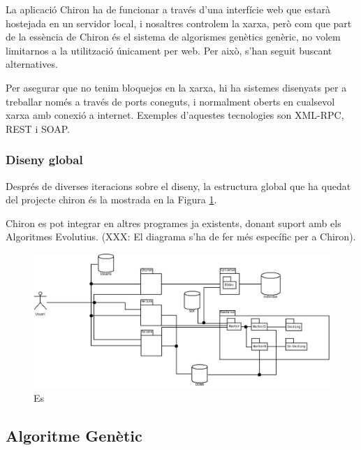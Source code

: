 \documentclass[titlepage,a4paper,12pt]{book}
\begin{document}
La aplicació Chiron ha de funcionar a través d'una interfície web que estarà
hostejada en un servidor local, i nosaltres controlem la xarxa, però com que
part de la essència de Chiron és el sistema de algorismes genètics genèric, no
volem limitarnos a la utilització únicament per web.  Per això, s'han seguit
buscant alternatives.

Per asegurar que no tenim bloquejos en la xarxa, hi ha sistemes disenyats per a
treballar només a través de ports coneguts, i normalment oberts en cualsevol
xarxa amb conexió a internet.  Exemples d'aquestes tecnologies son XML-RPC, REST
i SOAP.

\subsubsection{Diseny global} %
\label{ssub:Diseny global}

Després de diverses iteracions sobre el diseny, la estructura global que ha
quedat del projecte chiron és la mostrada en la Figura \ref{fig:disenyChiron}.

Chiron es pot integrar en altres programes ja existents, donant suport amb els
Algoritmes Evolutius.  (XXX: El diagrama s'ha de fer més específic per a
Chiron).

\begin{figure}[h]
	\begin{center}
		\includegraphics[scale=0.4]{chiron/arquitectura_global_chiron.jpg}
	\end{center}
	\caption{Es}
	\label{fig:disenyChiron}
\end{figure}


\subsection{Algoritme Genètic} %
	\label{sub:Algoritme Genetic}
\end{document}
